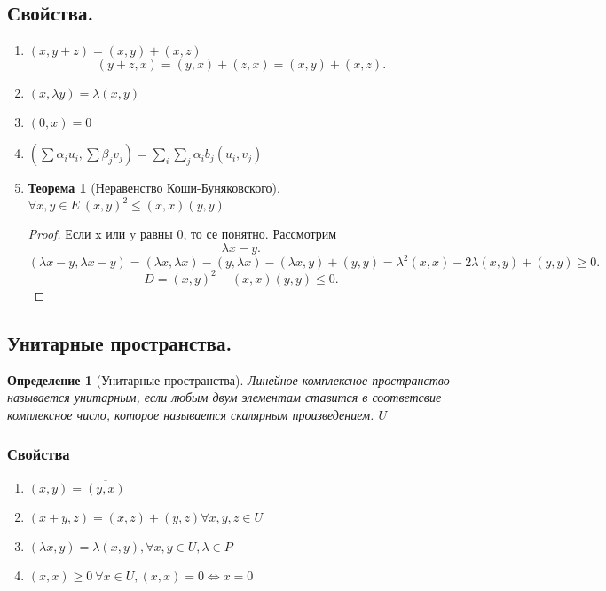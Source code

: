 \documentclass{scrartcl}
\newtheorem{theorem}{Теорема}
\newtheorem{definition}{Определение}
\begin{document}
\subsection{Свойства.}
\begin{enumerate}
	\item $(x,y+z) = (x,y) + (x,z)$
	      \[
		      (y + z,x ) = (y,x) + (z,x) = (x,y) + (x,z)
		      .\]
	\item $(x,\lambda y) = \lambda (x,y)$
	\item $(0,x) = 0 $
	\item $( \sum \alpha_{i} u_{i},\sum \beta_{j} v_{j} ) = \sum_{i}\sum_{j}\alpha_{i}b_{j}(u_{i},v_{j})$
	\item
	      \begin{theorem}[Неравенство Коши-Буняковского]
		      $\forall x,y \in E ~ (x,y)^{2} \le (x,x)(y,y)$
	      \end{theorem}
	      \begin{proof}
		      Если x или y равны 0, то се понятно. Рассмотрим
		      \[
			      \lambda x - y
			      .\]
		      \[
			      (\lambda x - y,\lambda x - y) = (\lambda x,\lambda x) - (y,\lambda x)
			      - (\lambda x, y) + (y,y) =
			      \lambda^2 (x,x) - 2\lambda (x,y) + (y,y) \ge  0
			      .\]
		      \[
			      D = (x,y)^2 - (x,x)(y,y) \le  0
			      .\]
	      \end{proof}
\end{enumerate}
\subsection{Унитарные пространства.}
\begin{definition}[Унитарные пространства]
	Линейное комплексное пространство называется унитарным, если любым двум элементам ставится в соответсвие комплексное число, которое называется скалярным произведением.
	$U$
\end{definition}
\subsubsection{Свойства}
\begin{enumerate}
	\item $(x,y) = \overline{(y,x)}$
	\item $(x+y,z) = (x,z) + (y,z) \forall  x,y,z \in U$
	\item $(\lambda x,y) = \lambda (x,y) , \forall  x,y \in U,\lambda \in P $
	\item $(x,x) \ge  0 ~\forall  x \in U, (x,x) = 0 \iff x = 0$
\end{enumerate}
\end{document}
